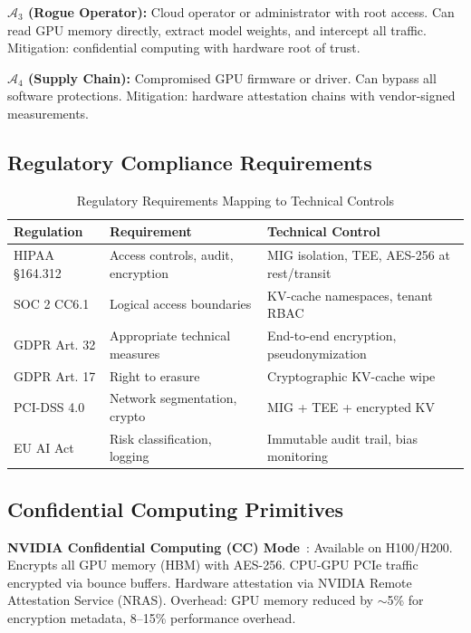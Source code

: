 \documentclass[conference,10pt]{IEEEtran}
\begin{document}
\textbf{$\mathcal{A}_3$ (Rogue Operator):} Cloud operator or administrator with root access. Can read GPU memory directly, extract model weights, and intercept all traffic. Mitigation: confidential computing with hardware root of trust.

\textbf{$\mathcal{A}_4$ (Supply Chain):} Compromised GPU firmware or driver. Can bypass all software protections. Mitigation: hardware attestation chains with vendor-signed measurements.

\subsection{Regulatory Compliance Requirements}

\begin{table}[!htbp]
\caption{Regulatory Requirements Mapping to Technical Controls}
\label{tab:reg}
\centering\footnotesize
\begin{tabular}{@{}lp{2.0cm}p{3.0cm}@{}}
\toprule
\textbf{Regulation} & \textbf{Requirement} & \textbf{Technical Control} \\
\midrule
HIPAA \S164.312 & Access controls, audit, encryption & MIG isolation, TEE, AES-256 at rest/transit \\
SOC 2 CC6.1 & Logical access boundaries & KV-cache namespaces, tenant RBAC \\
GDPR Art. 32 & Appropriate technical measures & End-to-end encryption, pseudonymization \\
GDPR Art. 17 & Right to erasure & Cryptographic KV-cache wipe \\
PCI-DSS 4.0 & Network segmentation, crypto & MIG + TEE + encrypted KV \\
EU AI Act & Risk classification, logging & Immutable audit trail, bias monitoring \\
\bottomrule
\end{tabular}
\end{table}

\subsection{Confidential Computing Primitives}

\textbf{NVIDIA Confidential Computing (CC) Mode}~\cite{nvidia2024cc}: Available on H100/H200. Encrypts all GPU memory (HBM) with AES-256. CPU-GPU PCIe traffic encrypted via bounce buffers. Hardware attestation via NVIDIA Remote Attestation Service (NRAS). Overhead: GPU memory reduced by $\sim$5\% for encryption metadata, 8--15\% performance overhead.
\end{document}
